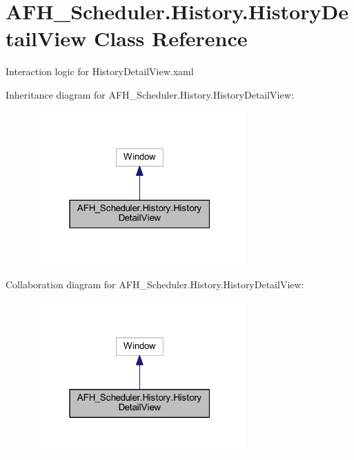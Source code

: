\section{A\+F\+H\+\_\+\+Scheduler.\+History.\+History\+Detail\+View Class Reference}
\label{class_a_f_h___scheduler_1_1_history_1_1_history_detail_view}


Interaction logic for History\+Detail\+View.\+xaml  




Inheritance diagram for A\+F\+H\+\_\+\+Scheduler.\+History.\+History\+Detail\+View\+:
\nopagebreak
\begin{figure}[H]
\begin{center}
\leavevmode
\includegraphics[width=232pt]{class_a_f_h___scheduler_1_1_history_1_1_history_detail_view__inherit__graph}
\end{center}
\end{figure}


Collaboration diagram for A\+F\+H\+\_\+\+Scheduler.\+History.\+History\+Detail\+View\+:
\nopagebreak
\begin{figure}[H]
\begin{center}
\leavevmode
\includegraphics[width=232pt]{class_a_f_h___scheduler_1_1_history_1_1_history_detail_view__coll__graph}
\end{center}
\end{figure}
